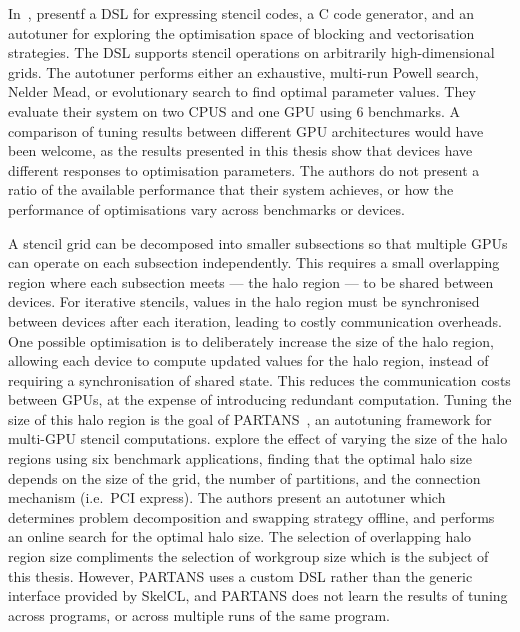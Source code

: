 \documentclass[nonatbib,preprint,10pt]{sigplanconf}
\begin{document}
In~\cite{Christen2011}, \citeauthor{Christen2011} presentf a DSL for
expressing stencil codes, a C code generator, and an autotuner for
exploring the optimisation space of blocking and vectorisation
strategies. The DSL supports stencil operations on arbitrarily
high-dimensional grids. The autotuner performs either an exhaustive,
multi-run Powell search, Nelder Mead, or evolutionary search to find
optimal parameter values. They evaluate their system on two CPUS and
one GPU using 6 benchmarks. A comparison of tuning results between
different GPU architectures would have been welcome, as the results
presented in this thesis show that devices have different responses to
optimisation parameters. The authors do not present a ratio of the
available performance that their system achieves, or how the
performance of optimisations vary across benchmarks or devices.

A stencil grid can be decomposed into smaller subsections so that
multiple GPUs can operate on each subsection independently. This
requires a small overlapping region where each subsection meets ---
the halo region --- to be shared between devices. For iterative
stencils, values in the halo region must be synchronised between
devices after each iteration, leading to costly communication
overheads. One possible optimisation is to deliberately increase the
size of the halo region, allowing each device to compute updated
values for the halo region, instead of requiring a synchronisation of
shared state. This reduces the communication costs between GPUs, at
the expense of introducing redundant computation. Tuning the size of
this halo region is the goal of PARTANS~\cite{Lutz2013}, an autotuning
framework for multi-GPU stencil computations. \citeauthor{Lutz2013}
explore the effect of varying the size of the halo regions using six
benchmark applications, finding that the optimal halo size depends on
the size of the grid, the number of partitions, and the connection
mechanism (i.e.\ PCI express). The authors present an autotuner which
determines problem decomposition and swapping strategy offline, and
performs an online search for the optimal halo size. The selection of
overlapping halo region size compliments the selection of workgroup
size which is the subject of this thesis. However, PARTANS uses a
custom DSL rather than the generic interface provided by SkelCL, and
PARTANS does not learn the results of tuning across programs, or
across multiple runs of the same program.


\end{document}
